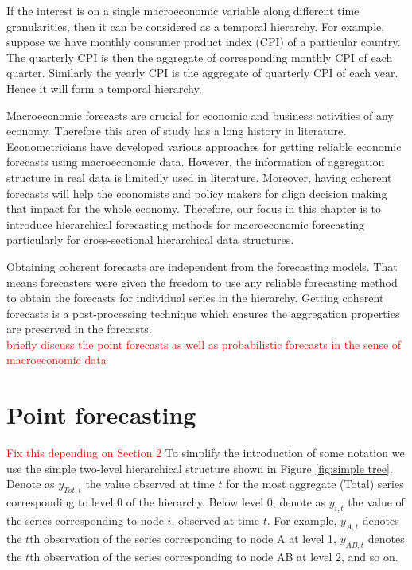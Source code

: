 \documentclass[graybox]{svmult}
\begin{document}
If the interest is on a single macroeconomic variable along different time granularities, then it can be considered as a temporal hierarchy. For example, suppose we have monthly consumer product index (CPI) of a particular country. The quarterly CPI is then the aggregate of corresponding monthly CPI of each quarter. Similarly the yearly CPI is the aggregate of quarterly CPI of each year. Hence it will form a temporal hierarchy.

Macroeconomic forecasts are crucial for economic and business activities of any economy. Therefore this area of study has a long history in literature. Econometricians have developed various approaches for getting reliable economic forecasts using macroeconomic data. However, the information of aggregation structure in real data is limitedly used in literature. Moreover, having coherent forecasts will help the economists and policy makers for align decision making that impact for the whole economy. Therefore, our focus in this chapter is to introduce hierarchical forecasting methods for macroeconomic forecasting particularly for cross-sectional hierarchical data structures.

Obtaining coherent forecasts are independent from the forecasting models. That means forecasters were given the freedom to use any reliable forecasting method to obtain the forecasts for individual series in the hierarchy. Getting coherent forecasts is a post-processing technique which ensures the aggregation properties are preserved in the forecasts.   \\


\textcolor{red}{briefly discuss the point forecasts as well as probabilistic forecasts in the sense of macroeconomic data  }

\newpage
\section{Point forecasting}\label{sec:point forecasting}

\textcolor{red}{Fix this depending on Section 2} To simplify the introduction of some notation we use the simple two-level hierarchical structure shown in Figure \ref{fig:simple tree}. Denote as $y_{Tot,t}$ the value observed at time $t$ for the most aggregate (Total) series  corresponding to level 0 of the hierarchy. Below level 0, denote as $y_{i,t}$ the value of the series corresponding to node $i$, observed at time $t$. For example, $y_{A,t}$ denotes the $t$th observation of the series corresponding to node A at level 1, $y_{AB,t}$ denotes the $t$th observation of the series corresponding to node AB at level 2, and so on.
\end{document}
